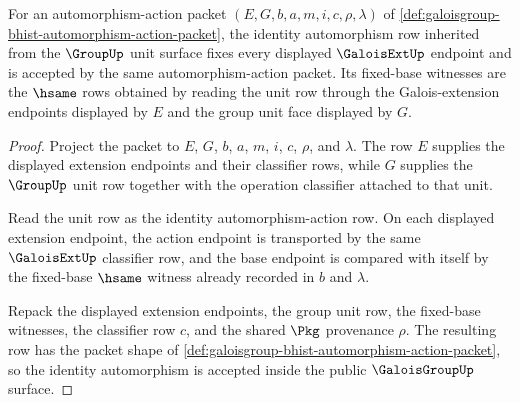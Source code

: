 \begin{theorem}
\label{thm:galoisgroup-identity-closure}
For an automorphism-action packet $(E,G,b,a,m,i,c,\rho,\lambda)$ of
\autoref{def:galoisgroup-bhist-automorphism-action-packet}, the identity
automorphism row inherited from the $\GroupUp$ unit surface fixes every
displayed $\GaloisExtUp$ endpoint and is accepted by the same
automorphism-action packet. Its fixed-base witnesses are the $\hsame$ rows
obtained by reading the unit row through the Galois-extension endpoints
displayed by $E$ and the group unit face displayed by $G$.
\end{theorem}
\begin{proof}
Project the packet to $E$, $G$, $b$, $a$, $m$, $i$, $c$, $\rho$, and
$\lambda$. The row $E$ supplies the displayed extension endpoints and their
classifier rows, while $G$ supplies the $\GroupUp$ unit row together with the
operation classifier attached to that unit.

Read the unit row as the identity automorphism-action row. On each displayed
extension endpoint, the action endpoint is transported by the same
$\GaloisExtUp$ classifier row, and the base endpoint is compared with itself
by the fixed-base $\hsame$ witness already recorded in $b$ and $\lambda$.

Repack the displayed extension endpoints, the group unit row, the fixed-base
witnesses, the classifier row $c$, and the shared $\Pkg$ provenance $\rho$.
The resulting row has the packet shape of
\autoref{def:galoisgroup-bhist-automorphism-action-packet}, so the identity
automorphism is accepted inside the public $\GaloisGroupUp$ surface.
\end{proof}

